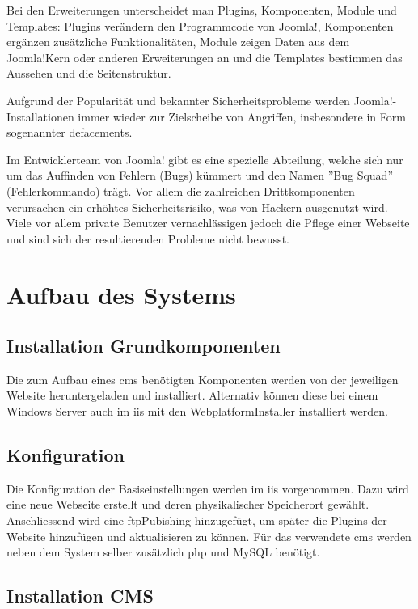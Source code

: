 \documentclass[a4paper,11pt,twoside,titlepage,openright]{report}
\numberwithin{equation}{section}		%
\numberwithin{figure}{section}			%
\numberwithin{table}{section}				%
\begin{document}
Bei den Erweiterungen unterscheidet man Plugins, Komponenten, Module und Templates: Plugins verändern den Programmcode von Joomla!, Komponenten ergänzen zusätzliche Funktionalitäten, Module zeigen Daten aus dem Joomla!\textendash Kern oder anderen Erweiterungen an und die Templates bestimmen das Aussehen und die Seitenstruktur.

Aufgrund der Popularität und bekannter Sicherheitsprobleme werden Joomla!-Installationen immer wieder zur Zielscheibe von Angriffen, insbesondere in Form sogenannter \glspl{defacement}.

Im Entwicklerteam von Joomla! gibt es eine spezielle Abteilung, welche sich nur um das Auffinden von Fehlern (Bugs) kümmert und den Namen ''Bug Squad'' (Fehlerkommando) trägt. Vor allem die zahlreichen Drittkomponenten verursachen ein erhöhtes Sicherheitsrisiko, was von Hackern ausgenutzt wird. Viele \textemdash vor allem private \textemdash Benutzer vernachlässigen jedoch die Pflege einer Webseite und sind sich der resultierenden Probleme nicht bewusst.

\chapter{Aufbau des Systems}
\section{Installation Grundkomponenten}
Die zum Aufbau eines \acrshort{cms} benötigten Komponenten werden von der jeweiligen Website heruntergeladen und installiert. Alternativ können diese bei einem Windows Server auch im \gls{iis} mit den Webplatform\textendash Installer installiert werden.

\section{Konfiguration}
Die Konfiguration der Basiseinstellungen werden im \acrshort{iis} vorgenommen. Dazu wird eine neue Webseite erstellt und deren physikalischer Speicherort gewählt. Anschliessend wird eine \acrshort{ftp}\textendash Pubishing hinzugefügt, um später die Plugins der Website hinzufügen und aktualisieren zu können. Für das verwendete \acrlong{cms} werden neben dem System selber zusätzlich \acrshort{php} und MySQL benötigt.

\section{Installation CMS}
\end{document}
